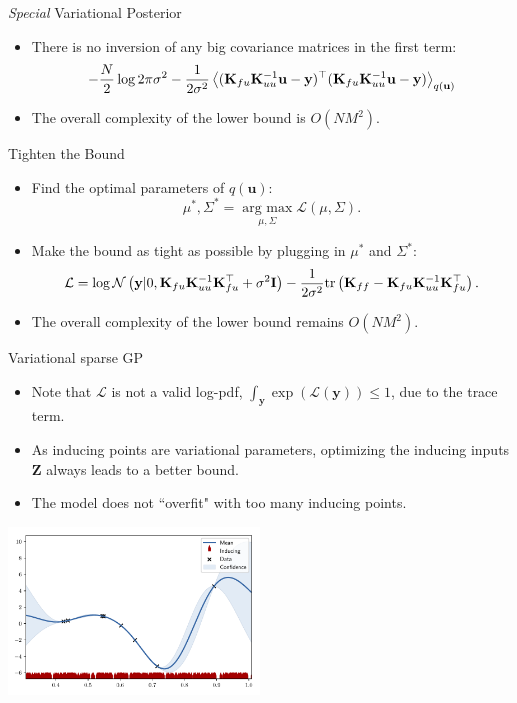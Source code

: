 \documentclass[14pt,aspectratio=1610]{beamer}
\newcommand{\yV}{\mathbf{y}}
\newcommand{\K}{\mathbf{K}}
\newcommand{\uV}{\mathbf{u}}
\newcommand{\zM}{\mathbf{Z}}
\newcommand{\bound}{\mathcal{L}}
\newcommand{\I}{\mathbf{I}}
\newcommand{\argmax}{\operatorname*{arg\: max}}
\begin{document}
\begin{frame}{\textit{Special} Variational Posterior}
\begin{itemize}
\item There is no inversion of any big covariance matrices in the first term:
\begin{align*}
 -\frac{N}{2}\log 2\pi \sigma^2 -\frac{1}{2\sigma^2}\expectation{(\K_{fu}\K_{uu}^{-1}\uV-\yV)^\top(\K_{fu}\K_{uu}^{-1}\uV-\yV)}_{q(\uV)}
\end{align*}
\item The overall complexity of the lower bound is $O(NM^2)$.
\end{itemize}
\end{frame}

\begin{frame}{Tighten the Bound}
\begin{itemize}
\item Find the optimal parameters of $q(\uV)$:
\[
\mu^*, \Sigma^* = \argmax_{\mu, \Sigma} \bound(\mu, \Sigma).
\]
\item Make the bound as tight as possible by plugging in $\mu^*$ and $\Sigma^*$:
\[
\bound = \log \gaussianDist{\yV}{0}{\K_{fu} \K_{uu}^{-1} \K_{fu}^\top+ \sigma^2\I} - \frac{1}{2\sigma^2}\tr{\K_{ff} - \K_{fu} \K_{uu}^{-1} \K_{fu}^\top}.
\]
\item The overall complexity of the lower bound remains $O(NM^2)$.
\end{itemize}
\end{frame}

\begin{frame}{Variational sparse GP}
\begin{itemize}
\item Note that $\bound$ is not a valid log-pdf, $\int_{\yV} \exp(\bound(\yV)) \leq 1$, due to the trace term.
\item As inducing points are variational parameters, optimizing the inducing inputs $\zM$ always leads to a better bound.
\item The model does not ``overfit" with too many inducing points. 
\end{itemize}
\vspace{-5mm}
\begin{center}
\includegraphics[width=0.5\textwidth]{sparsegp_example_lots_inducing_points.pdf} 
\end{center}
\end{frame}
\end{document}
